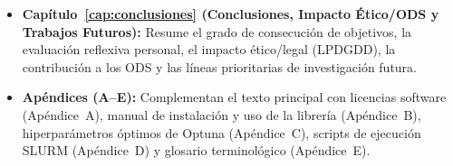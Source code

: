 \begin{itemize}
    \item \textbf{Capítulo~\ref{cap:conclusiones} (Conclusiones, Impacto Ético/ODS y Trabajos Futuros):} Resume el grado de consecución de objetivos, la evaluación reflexiva personal, el impacto ético/legal (LPDGDD), la contribución a los ODS y las líneas prioritarias de investigación futura.
    \item \textbf{Apéndices (A--E):} Complementan el texto principal con licencias software (Apéndice~A), manual de instalación y uso de la librería (Apéndice~B), hiperparámetros óptimos de Optuna (Apéndice~C), scripts de ejecución SLURM (Apéndice~D) y glosario terminológico (Apéndice~E).
\end{itemize}
